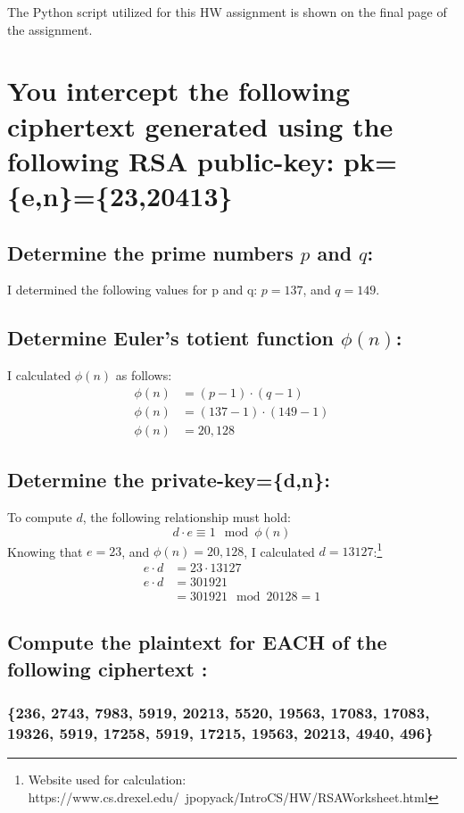 \documentclass{article}
\begin{document}
The Python script utilized for this HW assignment is shown on the final page of the assignment.

\section*{You intercept the following ciphertext generated using the following RSA public-key: pk=\{e,n\}=\{23,20413\}}
\subsection*{Determine the prime numbers $p$ and $q$:}

I determined the following values for p and q:
$p = 137$, and $q = 149$.

\subsection*{Determine Euler's totient function $\phi(n)$:}
I calculated $\phi(n)$ as follows:
\begin{align*}
\phi(n) &= (p-1) \cdot (q-1) \\
\phi(n) &= (137 - 1) \cdot (149 - 1) \\
\phi(n) &= 20,128
\end{align*}

\subsection*{Determine the private-key=\{d,n\}:}
To compute $d$, the following relationship must hold:
\begin{equation}
d \cdot e \equiv 1 \mod{\phi(n)} 
\end{equation}
Knowing that $e=23$, and $\phi(n) = 20,128$, I calculated $d= 13127$:\footnote{Website used for calculation:  https://www.cs.drexel.edu/~jpopyack/IntroCS/HW/RSAWorksheet.html}
\begin{align*}
e \cdot d &= 23 \cdot 13127 \\
e \cdot d &= 301921 \\
			&= 301921 \mod{20128} = 1
\end{align*}

\newpage

\subsection*{Compute the plaintext for EACH of the following ciphertext :}
\subsubsection*{\{236, 2743, 7983, 5919, 20213, 5520, 19563, 17083, 17083, 19326, 5919, 17258, 5919, 17215, 19563, 20213, 4940, 496\}}
\end{document}
